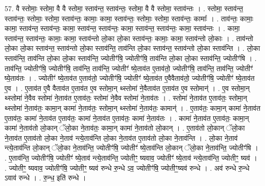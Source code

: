 \documentclass[17pt]{extarticle}
\begin{document}
57. वै स्तोमाः॒ स्तोमा॒ वै वै स्तोमा॒ स्ताव॑न्त॒ स्ताव॑न्तः॒ स्तोमा॒ वै वै स्तोमा॒ स्ताव॑न्तः । . स्तोमा॒ स्ताव॑न्त॒ स्ताव॑न्तः॒ स्तोमाः॒ स्तोमा॒ स्ताव॑न्तः॒ कामाः॒ कामा॒ स्ताव॑न्तः॒ स्तोमाः॒ स्तोमा॒ स्ताव॑न्तः॒ कामाः᳚ । . ताव॑न्तः॒ कामाः॒ कामा॒ स्ताव॑न्त॒ स्ताव॑न्तः॒ कामा॒ स्ताव॑न्त॒ स्ताव॑न्तः॒ कामा॒ स्ताव॑न्त॒ स्ताव॑न्तः॒ कामा॒ स्ताव॑न्तः । . कामा॒ स्ताव॑न्त॒ स्ताव॑न्तः॒ कामाः॒ कामा॒ स्ताव॑न्तो लो॒का लो॒का स्ताव॑न्तः॒ कामाः॒ कामा॒ स्ताव॑न्तो लो॒काः । . ताव॑न्तो लो॒का लो॒का स्ताव॑न्त॒ स्ताव॑न्तो लो॒का स्ताव॑न्ति॒ ताव॑न्ति लो॒का स्ताव॑न्त॒ स्ताव॑न्तो लो॒का स्ताव॑न्ति । . लो॒का स्ताव॑न्ति॒ ताव॑न्ति लो॒का लो॒का स्ताव॑न्ति॒ ज्योतीꣳ॑षि॒ ज्योतीꣳ॑षि॒ ताव॑न्ति लो॒का लो॒का स्ताव॑न्ति॒ ज्योतीꣳ॑षि । . ताव॑न्ति॒ ज्योतीꣳ॑षि॒ ज्योतीꣳ॑षि॒ ताव॑न्ति॒ ताव॑न्ति॒ ज्योतीꣳ॑ ष्ये॒ताव॑त ए॒ताव॑तो॒ ज्योतीꣳ॑षि॒ ताव॑न्ति॒ ताव॑न्ति॒ ज्योतीꣳ॑ ष्ये॒ताव॑तः । . ज्योतीꣳ॑ ष्ये॒ताव॑त ए॒ताव॑तो॒ ज्योतीꣳ॑षि॒ ज्योतीꣳ॑ ष्ये॒ताव॑त ए॒वैवैताव॑तो॒ ज्योतीꣳ॑षि॒ ज्योतीꣳ॑
ष्ये॒ताव॑त ए॒व । . ए॒ताव॑त ए॒वै वैताव॑त ए॒ताव॑त ए॒व स्तोमा॒न् थ्स्तोमा॑ ने॒वैताव॑त ए॒ताव॑त ए॒व स्तोमान्॑ । . ए॒व स्तोमा॒न् थ्स्तोमा॑ ने॒वैव स्तोमा॑ ने॒ताव॑त ए॒ताव॑तः॒ स्तोमा॑ ने॒वैव स्तोमा॑ ने॒ताव॑तः । . स्तोमा॑ ने॒ताव॑त ए॒ताव॑तः॒ स्तोमा॒न् थ्स्तोमा॑ ने॒ताव॑तः॒ कामा॒न् कामा॑ ने॒ताव॑तः॒ स्तोमा॒न् थ्स्तोमा॑ ने॒ताव॑तः॒ कामान्॑ । . ए॒ताव॑तः॒ कामा॒न् कामा॑ ने॒ताव॑त ए॒ताव॑तः॒ कामा॑ ने॒ताव॑त ए॒ताव॑तः॒ कामा॑ ने॒ताव॑त ए॒ताव॑तः॒ कामा॑ ने॒ताव॑तः । . कामा॑ ने॒ताव॑त ए॒ताव॑तः॒ कामा॒न् कामा॑ ने॒ताव॑तो लो॒कान् ॅलो॒का ने॒ताव॑तः॒ कामा॒न् कामा॑ ने॒ताव॑तो लो॒कान् । . ए॒ताव॑तो लो॒कान् ॅलो॒का ने॒ताव॑त ए॒ताव॑तो लो॒का ने॒ताव॑ न्त्ये॒ताव॑न्ति लो॒का ने॒ताव॑त ए॒ताव॑तो लो॒का ने॒ताव॑न्ति । . लो॒का ने॒ताव॑ न्त्ये॒ताव॑न्ति लो॒कान् ॅलो॒का ने॒ताव॑न्ति॒ ज्योतीꣳ॑षि॒ ज्योतीꣳ॑ ष्ये॒ताव॑न्ति लो॒कान् ॅलो॒का ने॒ताव॑न्ति॒ ज्योतीꣳ॑षि । . ए॒ताव॑न्ति॒ ज्योतीꣳ॑षि॒ ज्योतीꣳ॑ ष्ये॒ताव॑ न्त्ये॒ताव॑न्ति॒ ज्योतीꣳ॒॒ ष्यवाव॒ ज्योतीꣳ॑ ष्ये॒ताव॑ न्त्ये॒ताव॑न्ति॒ ज्योतीꣳ॒॒ ष्यव॑ । . ज्योतीꣳ॒॒ ष्यवाव॒ ज्योतीꣳ॑षि॒ ज्योतीꣳ॒॒ ष्यव॑ रुन्धे रु॒न्धे ऽव॒ ज्योतीꣳ॑षि॒ ज्योतीꣳ॒॒ष्यव॑ रुन्धे । . अव॑ रुन्धे रु॒न्धे ऽवाव॑ रुन्धे । . रु॒न्ध॒ इति॑ रुन्धे । \newline
\pagebreak
{}
\end{document}
